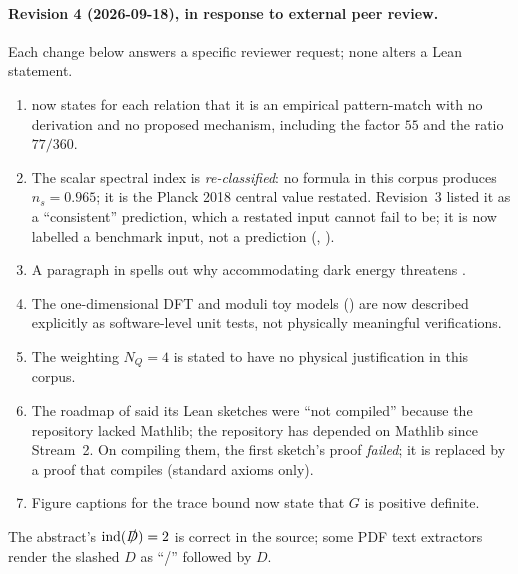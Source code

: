 \documentclass[11pt,a4paper]{article}
\theoremstyle{remark}
\begin{document}
\paragraph{Revision 4 (2026-09-18), in response to external peer review.} Each change below answers a
specific reviewer request; none alters a Lean statement.
\begin{enumerate}
  \item {} now states for each relation that it is an empirical pattern-match with
    no derivation and no proposed mechanism, including the factor $55$ and the ratio $77/360$.
  \item The scalar spectral index is \emph{re-classified}: no formula in this corpus produces
    $n_s=0.965$; it is the Planck 2018 central value restated. Revision~3 listed it as a
    ``consistent'' prediction, which a restated input cannot fail to be; it is now labelled a benchmark
    input, not a prediction (, ).
  \item A paragraph in  spells out why accommodating dark energy threatens
    .
  \item The one-dimensional DFT and moduli toy models () are now
    described explicitly as software-level unit tests, not physically meaningful verifications.
  \item The weighting $N_Q=4$ is stated to have no physical justification in this corpus.
  \item The roadmap of  said its Lean sketches were ``not compiled'' because the
    repository lacked Mathlib; the repository has depended on Mathlib since Stream~2. On compiling them,
    the first sketch's proof \emph{failed}; it is replaced by a proof that compiles (standard axioms only).
  \item Figure captions for the trace bound now state that $G$ is positive definite.
\end{enumerate}
The abstract's $\mathrm{ind}(\slashed D)=2$ is correct in the source; some PDF text extractors render
the slashed $D$ as ``/'' followed by $D$.
\end{document}
